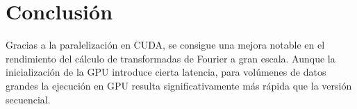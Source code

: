\documentclass[12pt]{article}
\begin{document}
\section*{Conclusión}

Gracias a la paralelización en CUDA, se consigue una mejora notable en el rendimiento del cálculo de transformadas de Fourier a gran escala. Aunque la inicialización de la GPU introduce cierta latencia, para volúmenes de datos grandes la ejecución en GPU resulta significativamente más rápida que la versión secuencial.
\end{document}
